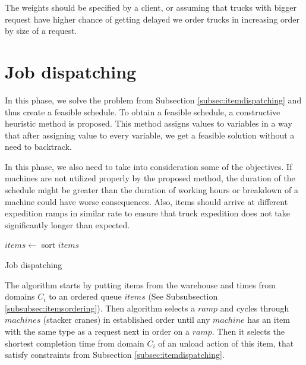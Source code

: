 \documentclass{ctuthesis}
\begin{document}
The weights should be specified by a client, or assuming that trucks with bigger request have higher chance of getting delayed we order trucks in increasing order by size of a request.

\section{Job dispatching}

In this phase, we solve the problem from Subsection \ref{subsec:itemdispatching} and thus create a feasible schedule.
To obtain a feasible schedule, a constructive heuristic method is proposed. This method assigns values to variables in a way that after assigning value to every variable, we get a feasible solution without a need to backtrack.

In this phase, we also need to take into consideration some of the objectives. If machines are not utilized properly by the proposed method, the duration of the schedule might be greater than the duration of working hours or breakdown of a machine could have worse consequences. Also, items should arrive at different expedition ramps in similar rate to ensure that truck expedition does not take significantly longer than expected.

\begin{algorithm}[H]
\SetAlgoLined
{}
  $items \leftarrow$ sort $items$\;
\caption{Job dispatching}
\end{algorithm}

The algorithm starts by putting items from the warehouse and times from domains $C_i$ to an ordered queue $items$ (See Subsubsection \ref{subsubsec:itemsordering}). Then algorithm selects a $ramp$ and cycles through $machines$ (stacker cranes) in established order until any $machine$ has an item with the same type as a request next in order on a $ramp$. Then it selects the shortest completion time from domain $C_i$ of an unload action of this item, that satisfy constraints from Subsection \ref{subsec:itemdispatching}. 
\end{document}
